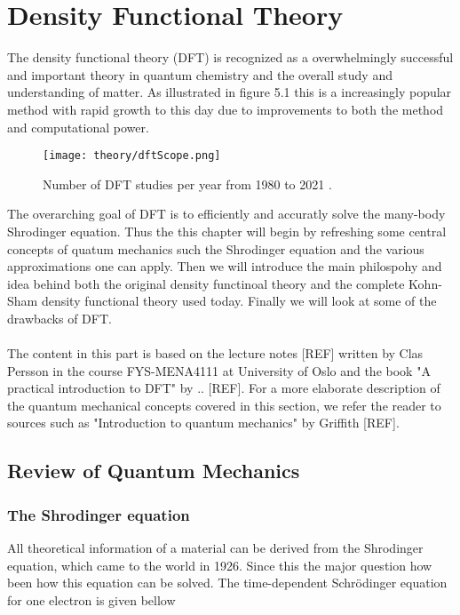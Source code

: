 \chapter{Density Functional Theory}
\label{sec:DFT}

The density functional theory (DFT) is recognized as a overwhelmingly successful and important theory in quantum chemistry and the overall study and understanding of matter. As illustrated in figure 5.1 this is a increasingly popular method with rapid growth to this day due to improvements to both the method and computational power.

\begin{figure}[H]
\texttt{[image: theory/dftScope.png]}
\caption{Number of DFT studies per year from 1980 to 2021 \cite{dimensions}.}
\end{figure}

The overarching goal of DFT is to efficiently and accuratly solve the many-body Shrodinger equation. Thus the this chapter will begin by refreshing some central concepts of quatum mechanics such the Shrodinger equation and the various approximations one can apply. Then we will introduce the main philospohy and idea behind both the original density functinoal theory and the complete Kohn-Sham density functional theory used today. Finally we will look at some of the drawbacks of DFT. \\\\

The content in this part is based on the lecture notes [REF] written by Clas Persson in the course FYS-MENA4111 at University of Oslo and the book "A practical introduction to DFT" by .. [REF]. For a more elaborate description of the quantum mechanical concepts covered in this section, we refer the reader to sources such as "Introduction to quantum mechanics" by Griffith [REF].

\section{Review of Quantum Mechanics}

\subsection{The Shrodinger equation}
All theoretical information of a material can be derived from the Shrodinger equation, which came to the world in 1926. Since this the major question how been how this equation can be solved. 
The time-dependent Schr\"{o}dinger equation for one electron is given bellow

